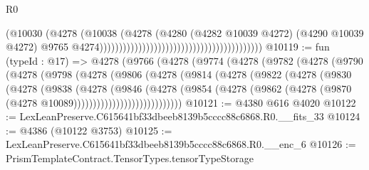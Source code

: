 \begin{lexlean}{R0}
\begin{coremodule}
                                                                              (@10030
                                                                                (@4278
                                                                                  (@10038
                                                                                    (@4278
                                                                                      (@4280
                                                                                        (@4282
                                                                                          @10039
                                                                                          @4272)
                                                                                        (@4290
                                                                                          @10039
                                                                                          @4272)
                                                                                        @9765
                                                                                        @4274))))))))))))))))))))))))))))))))))))))))))
@10119 := fun (typeId : @17) =>
  @4278
    (@9766
      (@4278
        (@9774
          (@4278
            (@9782
              (@4278
                (@9790
                  (@4278
                    (@9798
                      (@4278
                        (@9806
                          (@4278
                            (@9814
                              (@4278
                                (@9822
                                  (@4278
                                    (@9830
                                      (@4278
                                        (@9838
                                          (@4278
                                            (@9846
                                              (@4278
                                                (@9854
                                                  (@4278
                                                    (@9862
                                                      (@4278
                                                        (@9870
                                                          (@4278 @10089))))))))))))))))))))))))))))
@10121 := @4380 @616 @4020
@10122 := LexLeanPreserve.C615641bf33dbeeb8139b5cccc88c6868.R0.__fits_33
@10124 := @4386 (@10122 @3753)
@10125 := LexLeanPreserve.C615641bf33dbeeb8139b5cccc88c6868.R0.__enc_6
@10126 := PrismTemplateContract.TensorTypes.tensorTypeStorage

\end{coremodule}
\end{lexlean}

